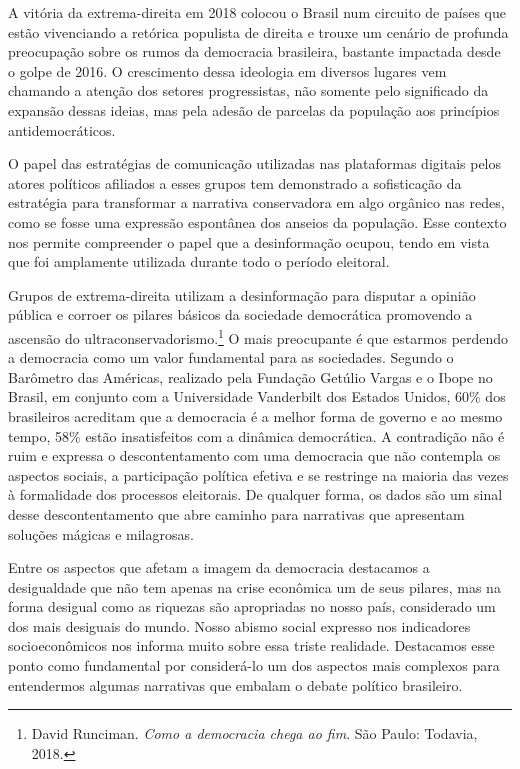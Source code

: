 A vitória da extrema-direita em 2018 colocou o Brasil num circuito de
países que estão vivenciando a retórica populista de direita e trouxe um
cenário de profunda preocupação sobre os rumos da democracia brasileira,
bastante impactada desde o golpe de 2016. O crescimento dessa
ideologia em diversos lugares vem chamando a atenção dos setores
progressistas, não somente pelo significado da expansão dessas ideias,
mas pela adesão de parcelas da população aos princípios
antidemocráticos.

O papel das estratégias de comunicação utilizadas nas plataformas
digitais pelos atores políticos afiliados a esses grupos tem demonstrado
a sofisticação da estratégia para transformar a narrativa conservadora
em algo orgânico nas redes, como se fosse uma expressão espontânea dos
anseios da população. Esse contexto nos permite compreender o papel que
a desinformação ocupou, tendo em vista que foi amplamente utilizada
durante todo o período eleitoral.

Grupos de extrema-direita utilizam a desinformação para disputar a
opinião pública e corroer os pilares básicos da sociedade democrática
promovendo a ascensão do ultraconservadorismo.\footnote{David Runciman. \textit{Como a democracia chega ao fim}. São Paulo: Todavia, 2018.} O mais
preocupante é que estarmos perdendo a democracia como um valor
fundamental para as sociedades. Segundo o Barômetro das Américas,
realizado pela Fundação Getúlio Vargas e o Ibope no Brasil, em conjunto
com a Universidade Vanderbilt dos Estados Unidos, 60\% dos brasileiros
acreditam que a democracia é a melhor forma de governo e ao mesmo tempo,
58\% estão insatisfeitos com a dinâmica democrática. A contradição não é
ruim e expressa o descontentamento com uma democracia que não contempla
os aspectos sociais, a participação política efetiva e se restringe na
maioria das vezes à formalidade dos processos eleitorais. De qualquer
forma, os dados são um sinal desse descontentamento que abre caminho para
narrativas que apresentam soluções mágicas e milagrosas.

Entre os aspectos que afetam a imagem da democracia destacamos a
desigualdade que não tem apenas na crise econômica um de seus pilares,
mas na forma desigual como as riquezas são apropriadas no nosso país,
considerado um dos mais desiguais do mundo. Nosso abismo social expresso
nos indicadores socioeconômicos nos informa muito sobre essa triste
realidade. Destacamos esse ponto como fundamental por considerá-lo um
dos aspectos mais complexos para entendermos algumas narrativas que
embalam o debate político brasileiro.

